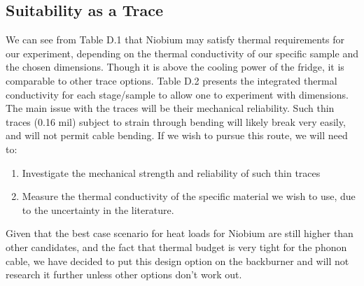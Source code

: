 \documentclass{report}
\begin{document}
\begin{appendices}
\section{Suitability as a Trace}
We can see from Table D.1 that Niobium may satisfy thermal requirements for our experiment, depending on the thermal conductivity of our specific sample and the chosen dimensions. Though it is above the cooling power of the fridge, it is comparable to other trace options. Table D.2 presents the integrated thermal conductivity for each stage/sample to allow one to experiment with dimensions. The main issue with the traces will be their mechanical reliability. Such thin traces (0.16 mil) subject to strain through bending will likely break very easily, and will not permit cable bending. If we wish to pursue this route, we will need to:
\begin{enumerate}
\item Investigate the mechanical strength and reliability of such thin traces
\item Measure the thermal conductivity of the specific material we wish to use, due to the uncertainty in the literature.
\end{enumerate}

Given that the best case scenario for heat loads for Niobium are still higher than other candidates, and the fact that thermal budget is very tight for the phonon cable, we have decided to put this design option on the backburner and will not research it further unless other options don't work out.

\end{appendices}
\end{document}
